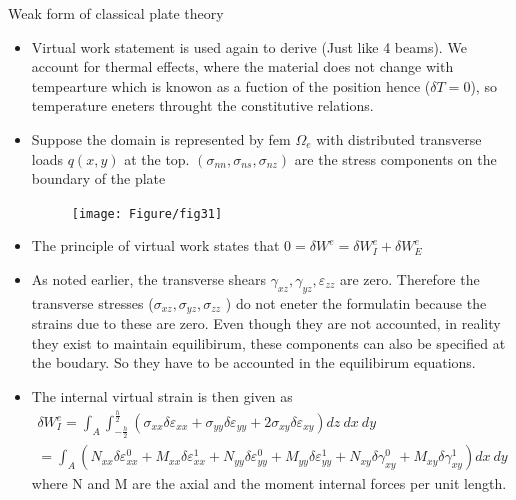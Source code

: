 	\begin{frame}{Weak form of classical plate theory}
		\begin{itemize}
			\item Virtual work statement is used again to derive (Just like 4 beams). We account for thermal effects, where the material does not change with tempearture which is knowon as a fuction of the position  hence ($\delta T = 0$), so temperature eneters throught the constitutive relations.
			\item Suppose the domain is represented by fem $\Omega_e$ with  distributed transverse loads $q(x,y)$ at the top. $(\sigma_{nn},\sigma_{ns},\sigma_{nz})$ are the stress components on the boundary of the plate
			\begin{figure}
				\centering
				\texttt{[image: Figure/fig31]} 		
			\end{figure}
		\end{itemize}
	\end{frame}


	\begin{frame}
		\begin{itemize}
			\item The principle of virtual work states that $0 = \delta W^e = \delta W_I^e + \delta W_E^e$
			\item As noted earlier, the transverse shears $\gamma_{xz},\gamma_{yz},\varepsilon_{zz}$ are zero. Therefore the transverse stresses ($\sigma_{xz},\sigma_{yz},\sigma_{zz}$ ) do not eneter the formulatin because the strains due to these are zero. Even though they are not accounted, in reality they exist to maintain equilibirum, these components can also be specified at the boudary. So they have to be accounted in the equilibirum equations. 
			\item The internal virtual strain is then given as 
			\begin{equation}
				\begin{aligned}
					\delta W_I^e = \int_A \int_{-\frac{h}{2}}^{\frac{h}{2}} 
					\left(
					\sigma_{xx} \delta \varepsilon_{xx} + \sigma_{yy} \delta \varepsilon_{yy} + 2\sigma_{xy} \delta \varepsilon_{xy}
					\right) dz~dx~dy\\
					= \int_A \left(N_{xx}\delta \varepsilon_{xx}^0 + M_{xx}\delta\varepsilon_{xx}^1 + N_{yy}\delta\varepsilon_{yy}^0 + M_{yy}\delta\varepsilon_{yy}^1 
					 + N_{xy}\delta\gamma_{xy}^0 + M_{xy}\delta\gamma_{xy}^1 \right) dx~dy
				\end{aligned}
			\end{equation}
			where N and M are the axial and the moment internal forces per unit length. 
		\end{itemize}
	\end{frame}


